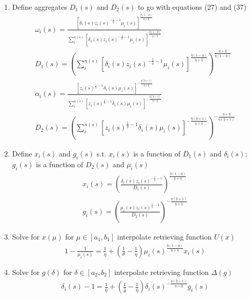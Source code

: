 \begin{enumerate}
    \item Define aggregates $D_1(s)$ and $D_2(s)$ to go with equations (27) and (37)
    \begin{align}
        \omega_i(s) = \frac{[\delta_i(s)z_i(s)^{-\frac{1}{ \hat{\eta}}-1}\mu_i(s)]^{\frac{\hat{\eta}(1-\eta)}{\eta+\hat{\eta}}}}{\sum_i^{n(s)} [\delta_i(s)z_i(s)^{-\frac{1}{ \hat{\eta}}-1}\mu_i(s)]^{\frac{\hat{\eta}(1-\eta)}{\eta+\hat{\eta}}}}\\
        D_1(s) = (\sum_i^{n(s)} [\delta_i(s)z_i(s)^{-\frac{1}{ \hat{\eta}}-1}\mu_i(s)]^{\frac{\hat{\eta}(1-\eta)}{\eta+\hat{\eta}}})^{\frac{\eta+\hat{\eta}  }{\hat{\eta}(1-\eta)}}\\
        \alpha_i(s)  =\frac{[z_i(s)^{\frac{1}{\eta}-1}\delta_i(s)\mu_i(s)]^{-\frac{\eta(\hat{\eta}+1)}{\eta+\hat{\eta}}}}{\sum_i^{n(s)} [z_i(s)^{\frac{1}{\eta}-1}\delta_i(s)\mu_i(s)]^{-\frac{\eta(\hat{\eta}+1)}{\eta+\hat{\eta}}}}\\
        D_2(s) = (\sum_i^{n(s)} [z_i(s)^{\frac{1}{\eta}-1}\delta_i(s)\mu_i(s)]^{-\frac{\eta(\hat{\eta}+1)}{\eta+\hat{\eta}}})^{-\frac{\eta+\hat{\eta}}{\eta(\hat{\eta}+1)}}
    \end{align}
    \item Define $x_i(s)$ and $g_i(s)$ s.t. $x_i(s)$ is a function of $D_1(s)$ and $\delta_i(s)$; $g_i(s)$ is a function of $D_2(s)$ and $\mu_i(s)$
    \begin{align}
        x_i(s) = (\frac{\delta_i(s) z_i(s)^{-\frac{1}{\hat{\eta}}-1}}{D_1(s)})^{\frac{\hat{\eta}(1-\eta)}{\eta + \hat{\eta}}}\\
        g_i(s) = (\frac{\mu_i(s) z_i(s)^{\frac{1}{\eta}-1}}{D_2(s)})^{-\frac{\eta(\hat{\eta}+1)}{\eta+\hat{\eta}}}
    \end{align}
    \item Solve for $x(\mu)$ for $\mu \in [a_1,b_1]$ interpolate retrieving function $U(x)$
    \begin{align}
    1- \frac{1}{\mu_i(s)}   = \frac{1}{\eta} + (\frac{1}{\theta} - \frac{1}{\eta} )\mu_i(s)^{\frac{\hat{\eta}(1-\eta)}{\eta + \hat{\eta}}} x_i(s)
    \end{align}
    \item Solve for $g(\delta)$ for $\delta \in [a_2,b_2]$ interpolate retrieving function $\Delta(g)$
    \begin{align}
        \delta_i(s)-1   = \frac{1}{\hat{\eta}} + (\frac{1}{\hat{\theta}} - \frac{1}{\hat{\eta}} )\delta_i(s)^{-\frac{\eta(\hat{\eta}+1)}{\eta+\hat{\eta}}} g_i(s)
    \end{align}

\end{enumerate}
